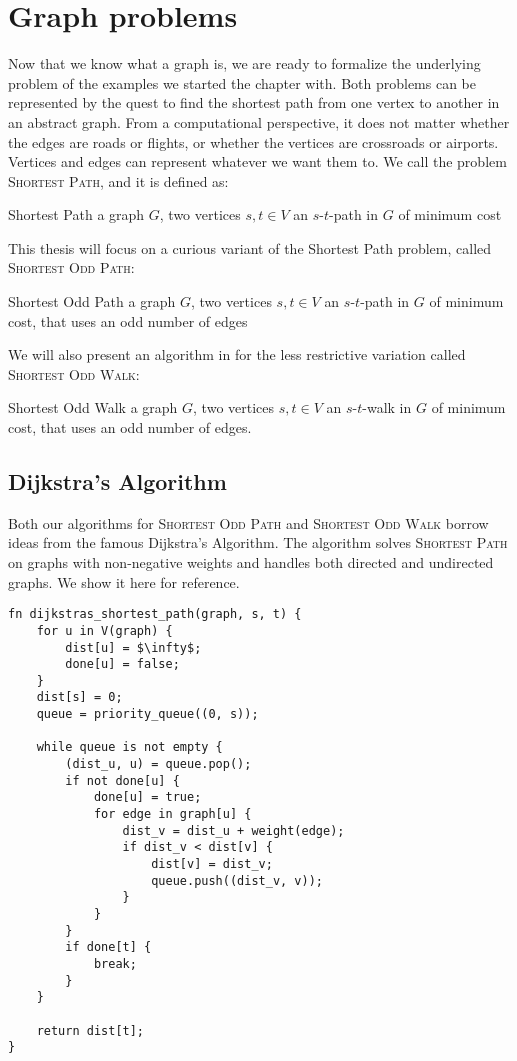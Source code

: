 \section{Graph problems}
\label{section:graph-problems}

Now that we know what a graph is, we are ready to formalize the underlying problem of the examples we started the chapter with. Both problems can be represented by the quest to find the shortest path from one vertex to another in an abstract graph. From a computational perspective, it does not matter whether the edges are roads or flights, or whether the vertices are crossroads or airports. Vertices and edges can represent whatever we want them to. We call the problem \textsc{Shortest Path}, and it is defined as:

\problem
{Shortest Path}
{a graph $G$, two vertices $s,t \in V$}
{an $s$-$t$-path in $G$ of minimum cost}

This thesis will focus on a curious variant of the Shortest Path problem, called \textsc{Shortest Odd Path}:

\problem
{Shortest Odd Path}
{a graph $G$, two vertices $s,t \in V$}
{an $s$-$t$-path in $G$ of minimum cost, that uses an odd number of edges}

We will also present an algorithm in  for the less restrictive variation called \textsc{Shortest Odd Walk}:

\problem
{Shortest Odd Walk}
{a graph $G$, two vertices $s,t \in V$}
{an $s$-$t$-walk in $G$ of minimum cost, that uses an odd number of edges.}

\subsection*{Dijkstra's Algorithm}
\label{algorithm:dijkstras-algorithm}
Both our algorithms for \textsc{Shortest Odd Path} and \textsc{Shortest Odd Walk} borrow ideas from the famous Dijkstra's Algorithm. The algorithm solves \textsc{Shortest Path} on graphs with non-negative weights and handles both directed and undirected graphs. We show it here for reference.

\begin{lstlisting}[caption={Dijkstra's Algorithm for Shortest Path},label=Listing,mathescape=true]
fn dijkstras_shortest_path(graph, s, t) {
    for u in V(graph) {
        dist[u] = $\infty$;
        done[u] = false;
    }
    dist[s] = 0;
    queue = priority_queue((0, s));

    while queue is not empty {
        (dist_u, u) = queue.pop();
        if not done[u] {
            done[u] = true;
            for edge in graph[u] {
                dist_v = dist_u + weight(edge);
                if dist_v < dist[v] {
                    dist[v] = dist_v;
                    queue.push((dist_v, v));
                }
            }
        }
        if done[t] { 
            break; 
        }
    }

    return dist[t];
}
\end{lstlisting}
